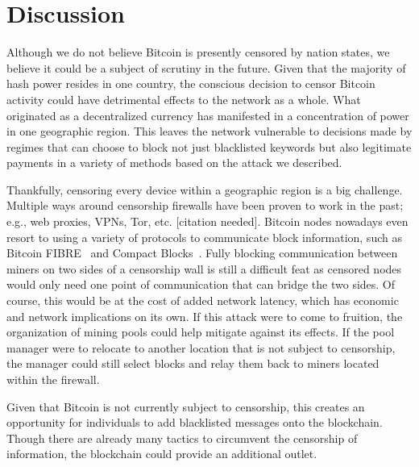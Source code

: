\section{Discussion}
Although we do not believe Bitcoin is presently censored by nation states, we believe it could be a subject of scrutiny in the future. Given that the majority of hash power resides in one country, the conscious decision to censor Bitcoin activity could have detrimental effects to the network as a whole. What originated as a decentralized currency has manifested in a concentration of power in one geographic region. This leaves the network vulnerable to decisions made by regimes that can choose to block not just blacklisted keywords but also legitimate payments in a variety of methods based on the attack we described.

Thankfully, censoring every device within a geographic region is a big challenge. Multiple ways around censorship firewalls have been proven to work in the past; e.g., web proxies, VPNs, Tor, etc. [citation needed]. Bitcoin nodes nowadays even resort to using a variety of protocols to communicate block information, such as Bitcoin FIBRE~\cite{fibre} and Compact Blocks~\cite{compact-blocks}. Fully blocking communication between miners on two sides of a censorship wall is still a difficult feat as censored nodes would only need one point of communication that can bridge the two sides. Of course, this would be at the cost of added network latency, which has economic and network implications on its own. If this attack were to come to fruition, the organization of mining pools could help mitigate against its effects. If the pool manager were to relocate to another location that is not subject to censorship, the manager could still select blocks and relay them back to miners located within the firewall.

Given that Bitcoin is not currently subject to censorship, this creates an opportunity for individuals to add blacklisted messages onto the blockchain. Though there are already many tactics to circumvent the censorship of information, the blockchain could provide an additional outlet.
